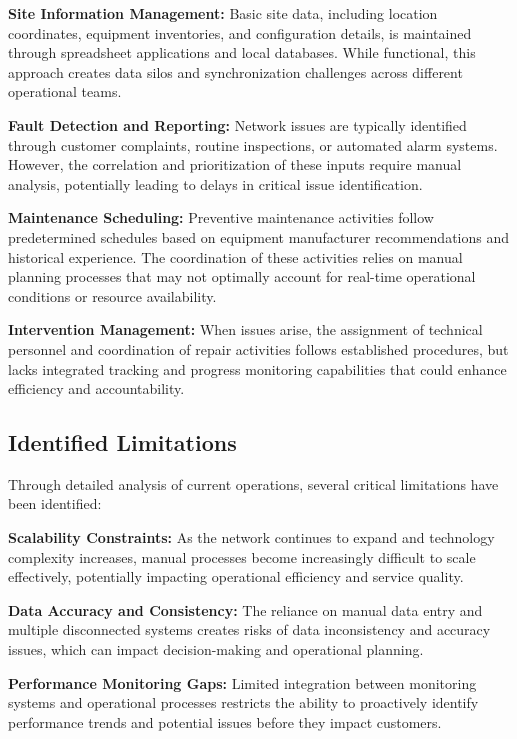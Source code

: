 \textbf{Site Information Management:} Basic site data, including location coordinates, equipment inventories, and configuration details, is maintained through spreadsheet applications and local databases. While functional, this approach creates data silos and synchronization challenges across different operational teams.

\textbf{Fault Detection and Reporting:} Network issues are typically identified through customer complaints, routine inspections, or automated alarm systems. However, the correlation and prioritization of these inputs require manual analysis, potentially leading to delays in critical issue identification.

\textbf{Maintenance Scheduling:} Preventive maintenance activities follow predetermined schedules based on equipment manufacturer recommendations and historical experience. The coordination of these activities relies on manual planning processes that may not optimally account for real-time operational conditions or resource availability.

\textbf{Intervention Management:} When issues arise, the assignment of technical personnel and coordination of repair activities follows established procedures, but lacks integrated tracking and progress monitoring capabilities that could enhance efficiency and accountability.

\subsection{Identified Limitations}

Through detailed analysis of current operations, several critical limitations have been identified:

\textbf{Scalability Constraints:} As the network continues to expand and technology complexity increases, manual processes become increasingly difficult to scale effectively, potentially impacting operational efficiency and service quality.

\textbf{Data Accuracy and Consistency:} The reliance on manual data entry and multiple disconnected systems creates risks of data inconsistency and accuracy issues, which can impact decision-making and operational planning.

\textbf{Performance Monitoring Gaps:} Limited integration between monitoring systems and operational processes restricts the ability to proactively identify performance trends and potential issues before they impact customers.

